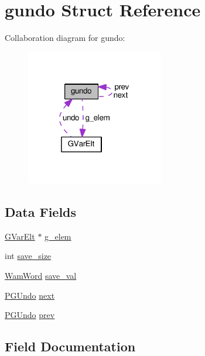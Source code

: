 \hypertarget{structgundo}{}\section{gundo Struct Reference}
\label{structgundo}


Collaboration diagram for gundo\+:\nopagebreak
\begin{figure}[H]
\begin{center}
\leavevmode
\includegraphics[width=170pt]{structgundo__coll__graph}
\end{center}
\end{figure}
\subsection*{Data Fields}
\begin{DoxyCompactItemize}
\item 
\hyperlink{structGVarElt}{G\+Var\+Elt} $\ast$ \hyperlink{structgundo_a215f96c167e2bc2aa0902fd04fcce89b}{g\+\_\+elem}
\item 
int \hyperlink{structgundo_a543c16d629efbb1e5e1260ef2f9438b5}{save\+\_\+size}
\item 
\hyperlink{LINUX__SIGSEGV_8c_a10ea8be8823feb38875b8a9326cbb424}{Wam\+Word} \hyperlink{structgundo_ad9b4b183b039fa879a47f9b4a400c742}{save\+\_\+val}
\item 
\hyperlink{g__var__inl__c_8c_acdaf5dcad7c3513abf1cb0d0615bde91}{P\+G\+Undo} \hyperlink{structgundo_aa4dd84818a7b36f26b0f7524e850fec9}{next}
\item 
\hyperlink{g__var__inl__c_8c_acdaf5dcad7c3513abf1cb0d0615bde91}{P\+G\+Undo} \hyperlink{structgundo_aeb28eb449ba2732d088663c85b986d75}{prev}
\end{DoxyCompactItemize}


\subsection{Field Documentation}
